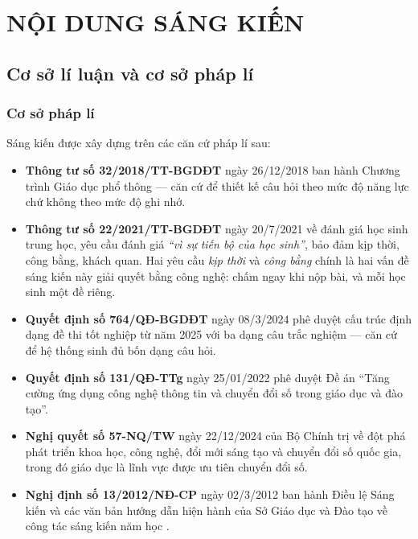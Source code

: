 \section{NỘI DUNG SÁNG KIẾN}

\subsection{Cơ sở lí luận và cơ sở pháp lí}

\subsubsection{Cơ sở pháp lí}

Sáng kiến được xây dựng trên các căn cứ pháp lí sau:

\begin{itemize}[leftmargin=1.2cm, itemsep=3pt]
  \item \textbf{Thông tư số 32/2018/TT-BGDĐT} ngày 26/12/2018 ban hành Chương
        trình Giáo dục phổ thông --- căn cứ để thiết kế câu hỏi theo mức độ
        năng lực chứ không theo mức độ ghi nhớ.
  \item \textbf{Thông tư số 22/2021/TT-BGDĐT} ngày 20/7/2021 về đánh giá học
        sinh trung học, yêu cầu đánh giá \textit{``vì sự tiến bộ của học
        sinh''}, bảo đảm kịp thời, công bằng, khách quan. Hai yêu cầu
        \textit{kịp thời} và \textit{công bằng} chính là hai vấn đề sáng kiến
        này giải quyết bằng công nghệ: chấm ngay khi nộp bài, và mỗi học sinh
        một đề riêng.
  \item \textbf{Quyết định số 764/QĐ-BGDĐT} ngày 08/3/2024 phê duyệt cấu trúc
        định dạng đề thi tốt nghiệp từ năm 2025 với ba dạng câu trắc nghiệm ---
        căn cứ để hệ thống sinh đủ bốn dạng câu hỏi.
  \item \textbf{Quyết định số 131/QĐ-TTg} ngày 25/01/2022 phê duyệt Đề án
        ``Tăng cường ứng dụng công nghệ thông tin và chuyển đổi số trong giáo
        dục và đào tạo''.
  \item \textbf{Nghị quyết số 57-NQ/TW} ngày 22/12/2024 của Bộ Chính trị về đột
        phá phát triển khoa học, công nghệ, đổi mới sáng tạo và chuyển đổi số
        quốc gia, trong đó giáo dục là lĩnh vực được ưu tiên chuyển đổi số.
  \item \textbf{Nghị định số 13/2012/NĐ-CP} ngày 02/3/2012 ban hành Điều lệ
        Sáng kiến và các văn bản hướng dẫn hiện hành của Sở Giáo dục và Đào tạo
        về công tác sáng kiến năm học \NAMHOC.
\end{itemize}

